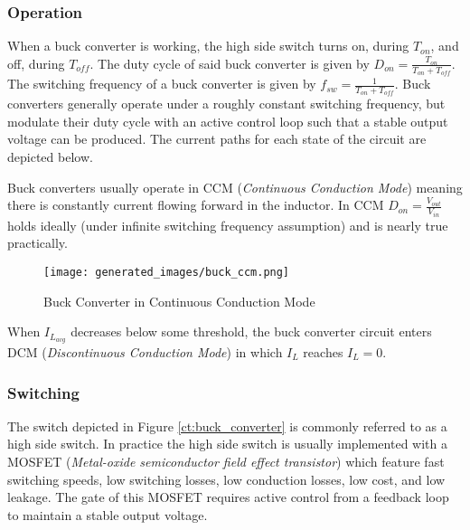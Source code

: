 \documentclass[main.tex]{subfiles}
\begin{document}
\subsubsection{Operation}
When a buck converter is working, the high side switch turns on, during $T_{on}$, and off, during $T_{off}$. The duty cycle of said buck converter is given by $D_{on} = \frac{T_{on}}{T_{on} + T_{off}}$. The switching frequency of a buck converter is given by $f_{sw} = \frac{1}{T_{on} + T_{off}}$. Buck converters generally operate under a roughly constant switching frequency, but modulate their duty cycle with an active control loop such that a stable output voltage can be produced. The current paths for each state of the circuit are depicted below. 



Buck converters usually operate in CCM (\textit{Continuous Conduction Mode}) meaning there is constantly current flowing forward in the inductor. In CCM $D_{on} = \frac{V_{out}}{V_{in}}$ holds ideally (under infinite switching frequency assumption) and is nearly true practically. 

\begin{figure}[H]
    \centering
    \texttt{[image: generated\_images/buck\_ccm.png]}
    \caption{Buck Converter in Continuous Conduction Mode}
    \label{fig:buck-ccm}
\end{figure}

When $I_{L_{avg}}$ decreases below some threshold, the buck converter circuit enters DCM (\textit{Discontinuous Conduction Mode}) in which $I_L$ reaches $I_L = 0$.



\subsubsection{Switching}
The switch depicted in Figure \ref{ct:buck_converter} is commonly referred to as a high side switch. In practice the high side switch is usually implemented with a MOSFET (\textit{Metal-oxide semiconductor field effect transistor}) which feature fast switching speeds, low switching losses, low conduction losses, low cost, and low leakage. The gate of this MOSFET requires active control from a feedback loop to maintain a stable output voltage.
\end{document}
